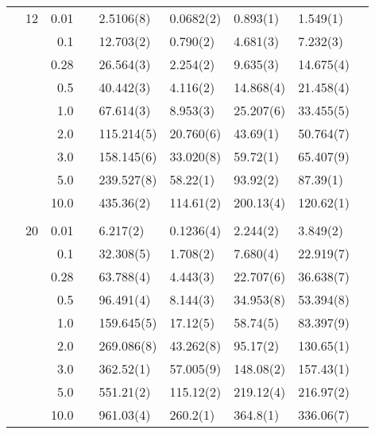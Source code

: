 \begin{table}[H]
\begin{tabularx}{\textwidth}{R{1cm}rrcR{2.3cm}R{2.3cm}R{2.3cm}R{2.3cm}R{1cm}}
		&12 & 0.01 && 2.5106(8) & 0.0682(2) & 0.893(1) & 1.549(1) \\
		&& 0.1 && 12.703(2) & 0.790(2) & 4.681(3) & 7.232(3) \\
		&& 0.28 && 26.564(3) & 2.254(2) & 9.635(3) & 14.675(4) \\
		&& 0.5 && 40.442(3) & 4.116(2) & 14.868(4) & 21.458(4) \\
		&& 1.0 && 67.614(3) & 8.953(3) & 25.207(6) & 33.455(5) \\
		&& 2.0 && 115.214(5) & 20.760(6) & 43.69(1) & 50.764(7) \\
		&& 3.0 && 158.145(6) & 33.020(8) & 59.72(1) & 65.407(9) \\ 
		&& 5.0 && 239.527(8) & 58.22(1) & 93.92(2) & 87.39(1) \\
		&& 10.0 && 435.36(2) & 114.61(2) & 200.13(4) & 120.62(1) \\
		\hdashline \\
		
		&20 & 0.01 && 6.217(2) & 0.1236(4) & 2.244(2) & 3.849(2) \\
		&& 0.1 && 32.308(5) & 1.708(2) & 7.680(4) & 22.919(7) \\
		&& 0.28 && 63.788(4) & 4.443(3) & 22.707(6) & 36.638(7) \\
		&& 0.5 && 96.491(4) & 8.144(3) & 34.953(8) & 53.394(8) \\
		&& 1.0 && 159.645(5) & 17.12(5) & 58.74(5) & 83.397(9) \\
		&& 2.0 && 269.086(8) & 43.262(8) & 95.17(2) & 130.65(1) \\
		&& 3.0 && 362.52(1) & 57.005(9) & 148.08(2) & 157.43(1) \\ 
		&& 5.0 && 551.21(2) & 115.12(2) & 219.12(4) & 216.97(2) \\
		&& 10.0 && 961.03(4) & 260.2(1) & 364.8(1) & 336.06(7) \\
		\hline \hline
	\end{tabularx}
\end{table} 


